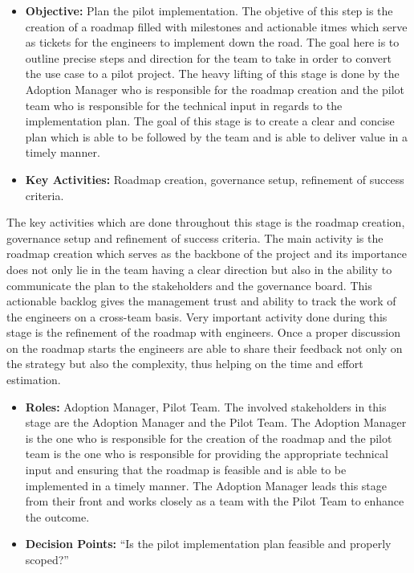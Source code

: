 \documentclass[]{imc-inf}
\def\tightlist{}
\begin{document}
\begin{itemize}
	\tightlist
	\item
	\textbf{Objective:} Plan the pilot implementation. The objetive of
	this step is the creation of a roadmap filled with milestones and
	actionable itmes which serve as tickets for the engineers to implement
	down the road. The goal here is to outline precise steps and direction
	for the team to take in order to convert the use case to a pilot
	project. The heavy lifting of this stage is done by the Adoption
	Manager who is responsible for the roadmap creation and the pilot team
	who is responsible for the technical input in regards to the
	implementation plan. The goal of this stage is to create a clear and
	concise plan which is able to be followed by the team and is able to
	deliver value in a timely manner.
	\item
	\textbf{Key Activities:} Roadmap creation, governance setup,
	refinement of success criteria.
\end{itemize}

The key activities which are done throughout this stage is the roadmap
creation, governance setup and refinement of success criteria. The main
activity is the roadmap creation which serves as the backbone of the
project and its importance does not only lie in the team having a clear
direction but also in the ability to communicate the plan to the
stakeholders and the governance board. This actionable backlog gives the
management trust and ability to track the work of the engineers on a
cross-team basis. Very important activity done during this stage is the
refinement of the roadmap with engineers. Once a proper discussion on
the roadmap starts the engineers are able to share their feedback not
only on the strategy but also the complexity, thus helping on the time
and effort estimation.

\begin{itemize}
	\item
	\textbf{Roles:} Adoption Manager, Pilot Team. The involved
	stakeholders in this stage are the Adoption Manager and the Pilot
	Team. The Adoption Manager is the one who is responsible for the
	creation of the roadmap and the pilot team is the one who is
	responsible for providing the appropriate technical input and ensuring
	that the roadmap is feasible and is able to be implemented in a timely
	manner. The Adoption Manager leads this stage from their front and
	works closely as a team with the Pilot Team to enhance the outcome.
	\item
	\textbf{Decision Points:} ``Is the pilot implementation plan feasible
	and properly scoped?''
\end{itemize}
\end{document}
